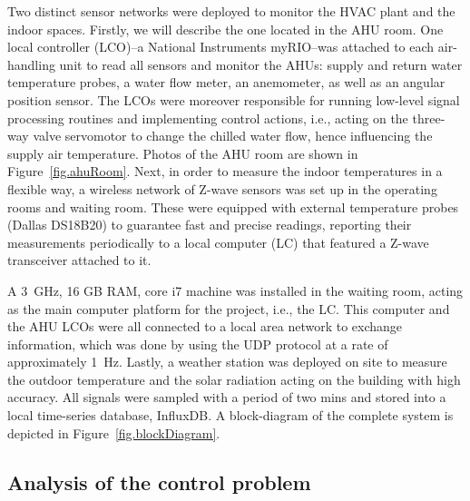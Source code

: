 Two distinct sensor networks were deployed to monitor the HVAC plant and the indoor spaces. Firstly, we will describe the one located in the AHU room. One local controller (LCO)--a National Instruments myRIO--was attached to each air-handling unit to read all sensors and monitor the AHUs: supply and return water temperature probes, a water flow meter, an anemometer, as well as an angular position sensor. The LCOs were moreover responsible for running low-level signal processing routines and implementing control actions, i.e., acting on the three-way valve servomotor to change the chilled water flow, hence influencing the supply air temperature. Photos of the AHU room are shown in Figure~\ref{fig.ahuRoom}. Next, in order to measure the indoor temperatures in a flexible way, a wireless network of Z-wave sensors was set up in the operating rooms and waiting room. These were equipped with external temperature probes (Dallas DS18B20) to guarantee fast and precise readings, reporting their measurements periodically to a local computer (LC) that featured a Z-wave transceiver attached to it.

{\tiny }A 3~GHz, 16 GB RAM, core i7 machine was installed in the waiting room, acting as the main computer platform for the project, i.e., the LC. This computer and the AHU LCOs were all connected to a local area network to exchange information, which was done by using the UDP protocol at a rate of approximately 1~Hz. Lastly, a weather station was deployed on site to measure the outdoor temperature and the solar radiation acting on the building with high accuracy. All signals were sampled with a period of two mins and stored into a local time-series database, InfluxDB. A block-diagram of the complete system is depicted in Figure~\ref{fig.blockDiagram}.  



\subsection{Analysis of the control problem}
\label{sec.controlProb}

